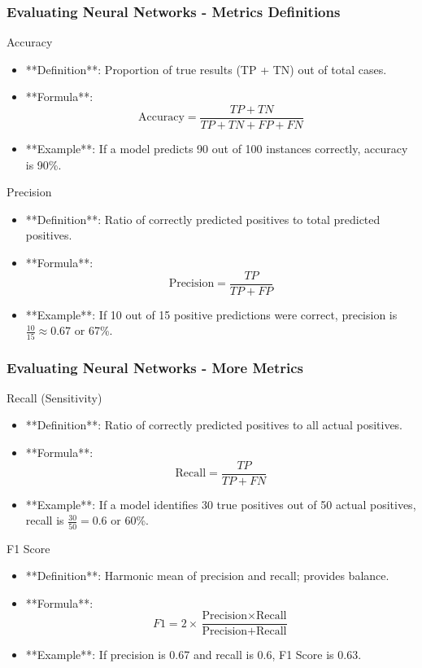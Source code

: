 \documentclass[aspectratio=169]{beamer}
\begin{document}
\begin{frame}[fragile]
  \frametitle{Evaluating Neural Networks - Metrics Definitions}
  
  \begin{block}{Accuracy}
      \begin{itemize}
          \item **Definition**: Proportion of true results (TP + TN) out of total cases.
          \item **Formula**: 
          \[
          \text{Accuracy} = \frac{TP + TN}{TP + TN + FP + FN}
          \]
          \item **Example**: If a model predicts 90 out of 100 instances correctly, accuracy is 90\%.
      \end{itemize}
  \end{block}
  
  \begin{block}{Precision}
      \begin{itemize}
          \item **Definition**: Ratio of correctly predicted positives to total predicted positives.
          \item **Formula**: 
          \[
          \text{Precision} = \frac{TP}{TP + FP}
          \]
          \item **Example**: If 10 out of 15 positive predictions were correct, precision is \( \frac{10}{15} \approx 0.67 \) or 67\%.
      \end{itemize}
  \end{block}
\end{frame}

\begin{frame}[fragile]
  \frametitle{Evaluating Neural Networks - More Metrics}
  
  \begin{block}{Recall (Sensitivity)}
      \begin{itemize}
          \item **Definition**: Ratio of correctly predicted positives to all actual positives.
          \item **Formula**: 
          \[
          \text{Recall} = \frac{TP}{TP + FN}
          \]
          \item **Example**: If a model identifies 30 true positives out of 50 actual positives, recall is \( \frac{30}{50} = 0.6 \) or 60\%.
      \end{itemize}
  \end{block}
  
  \begin{block}{F1 Score}
      \begin{itemize}
          \item **Definition**: Harmonic mean of precision and recall; provides balance.
          \item **Formula**: 
          \[
          F1 = 2 \times \frac{\text{Precision} \times \text{Recall}}{\text{Precision} + \text{Recall}}
          \]
          \item **Example**: If precision is 0.67 and recall is 0.6, F1 Score is \( 0.63 \).
      \end{itemize}
  \end{block}
\end{frame}
\end{document}
